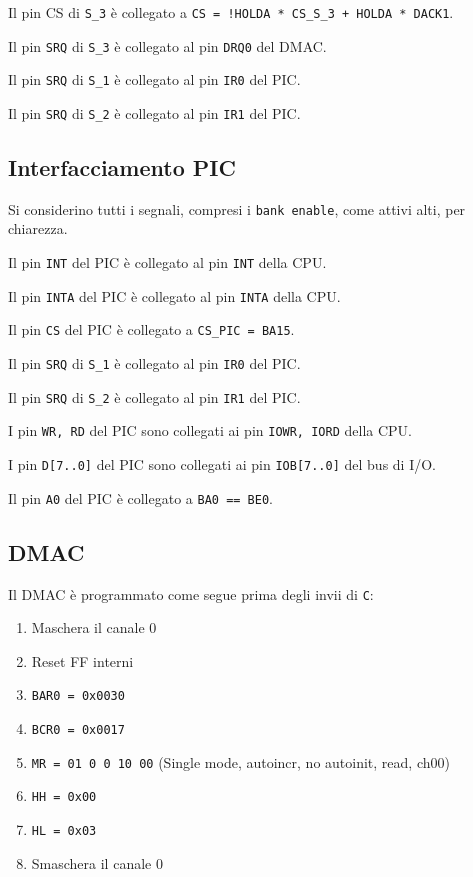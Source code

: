 \documentclass[a4paper]{article}
\begin{document}
Il pin CS di \texttt{S\_3} è collegato a \texttt{CS = !HOLDA * CS\_S\_3 + HOLDA * DACK1}.

Il pin \texttt{SRQ} di \texttt{S\_3} è collegato al pin \texttt{DRQ0} del DMAC.

Il pin \texttt{SRQ} di \texttt{S\_1} è collegato al pin \texttt{IR0} del PIC.

Il pin \texttt{SRQ} di \texttt{S\_2} è collegato al pin \texttt{IR1} del PIC.

\subsection{Interfacciamento PIC}
Si considerino tutti i segnali, compresi i \texttt{bank enable}, come attivi alti, per chiarezza.

Il pin \texttt{INT} del PIC è collegato al pin \texttt{INT} della CPU.

Il pin \texttt{INTA} del PIC è collegato al pin \texttt{INTA} della CPU.

Il pin \texttt{CS} del PIC è collegato a \texttt{CS\_PIC = BA15}.

Il pin \texttt{SRQ} di \texttt{S\_1} è collegato al pin \texttt{IR0} del PIC.

Il pin \texttt{SRQ} di \texttt{S\_2} è collegato al pin \texttt{IR1} del PIC.

I pin \texttt{WR, RD} del PIC sono collegati ai pin \texttt{IOWR, IORD} della CPU.

I pin \texttt{D[7..0]} del PIC sono collegati ai pin \texttt{IOB[7..0]} del bus di I/O.

Il pin \texttt{A0} del PIC è collegato a \texttt{BA0 == BE0}.

\subsection{DMAC}

Il DMAC è programmato come segue prima degli invii di \texttt{C}:
\begin{enumerate}
\item Maschera il canale 0
\item Reset FF interni
\item \texttt{BAR0 = 0x0030}
\item \texttt{BCR0 = 0x0017}
\item \texttt{MR = 01 0 0 10 00} (Single mode, autoincr, no autoinit, read, ch00)
\item \texttt{HH = 0x00}
\item \texttt{HL = 0x03}
\item Smaschera il canale 0
\end{enumerate}
\end{document}
